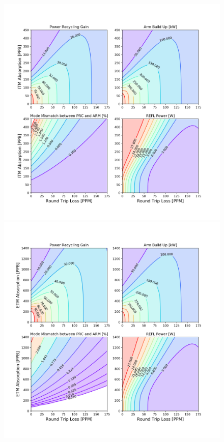 \begin{figure}
	\centering
	\begin{minipage}{0.5\textheight}
		\centering
		\includegraphics[height=0.5 \textheight]{../Figures/Simplified_PRC_ARM_itm_abs.png}
	\end{minipage}\hfill
	\begin{minipage}{0.5\textheight}
	\centering
		\includegraphics[height=0.5 \textheight]{../Figures/Simplified_PRC_ARM_etm_abs.png}

\end{minipage}
\end{figure}
